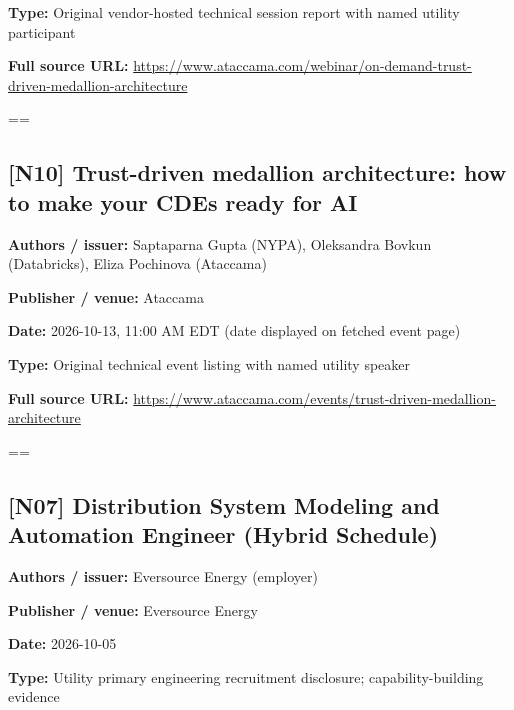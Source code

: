 \documentclass[10pt,letterpaper]{article}
\begin{document}
\textbf{Type:} Original vendor-hosted technical session report with named utility participant\par
\textbf{Full source URL:} \href{https://www.ataccama.com/webinar/on-demand-trust-driven-medallion-architecture}{\small\ttfamily https:/\allowbreak{}/\allowbreak{}www.\allowbreak{}ataccama.\allowbreak{}com/\allowbreak{}webinar/\allowbreak{}on-\allowbreak{}demand-\allowbreak{}trust-\allowbreak{}driven-\allowbreak{}medallion-\allowbreak{}architecture}\par
\egroup\par\noindent\box\readingEntry\par\medskip
\setbox\readingEntry=\vbox\bgroup\hsize=\linewidth\subsection*{[N10] Trust-driven medallion architecture: how to make your CDEs ready for AI}
\textbf{Authors / issuer:} Saptaparna Gupta (NYPA), Oleksandra Bovkun (Databricks), Eliza Pochinova (Ataccama)\par
\textbf{Publisher / venue:} Ataccama\par
\textbf{Date:} 2026-10-13, 11:00 AM EDT (date displayed on fetched event page)\par
\textbf{Type:} Original technical event listing with named utility speaker\par
\textbf{Full source URL:} \href{https://www.ataccama.com/events/trust-driven-medallion-architecture}{\small\ttfamily https:/\allowbreak{}/\allowbreak{}www.\allowbreak{}ataccama.\allowbreak{}com/\allowbreak{}events/\allowbreak{}trust-\allowbreak{}driven-\allowbreak{}medallion-\allowbreak{}architecture}\par
\egroup\par\noindent\box\readingEntry\par\medskip
\setbox\readingEntry=\vbox\bgroup\hsize=\linewidth\subsection*{[N07] Distribution System Modeling and Automation Engineer (Hybrid Schedule)}
\textbf{Authors / issuer:} Eversource Energy (employer)\par
\textbf{Publisher / venue:} Eversource Energy\par
\textbf{Date:} 2026-10-05\par
\textbf{Type:} Utility primary engineering recruitment disclosure; capability-building evidence\par
\end{document}
